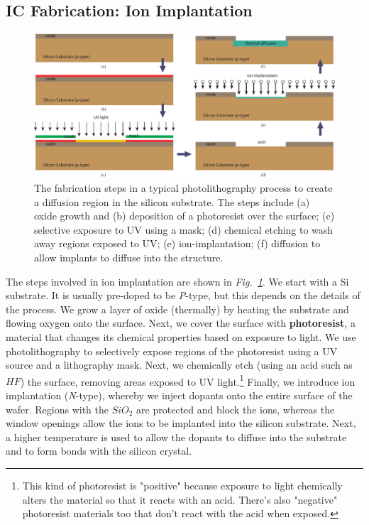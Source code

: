 \subsection{IC Fabrication: Ion Implantation}
\begin{figure}[tb]
\centering
\includegraphics[width=\columnwidth]{process_steps}
\caption{The fabrication steps in a typical photolithography process to create a diffusion region in the silicon substrate.  The steps include (a) oxide growth and (b) deposition of a photoresist over the surface; (c) selective exposure to UV using a mask; (d) chemical etching to wash away regions exposed to UV; (e) ion-implantation; (f) diffusion to allow implants to diffuse into the structure.} \label{fig:mod2-2_ICtech_sld_4}
\end{figure}
The steps involved in ion implantation are shown in \emph{Fig.~\ref{fig:mod2-2_ICtech_sld_4}}.  We start with a Si substrate.  It is usually pre-doped to be \emph{P}-type, but this depends on the details of the process.  We grow a layer of oxide (thermally) by heating the substrate and flowing oxygen onto the surface.  Next, we cover the surface with \textbf{photoresist}, a material that changes its chemical properties based on exposure to light.  We use photolithography to selectively expose regions of the photoresist using a UV source and a lithography mask.  Next, we chemically etch (using an acid such as $HF$)  the surface, removing areas exposed to UV light.\footnote{This kind of photoresist is "positive" because exposure to light chemically alters the material so that it reacts with an acid. There's also  "negative" photoresist materials too that don't react with the acid when exposed.}  Finally, we introduce ion implantation (\emph{N}-type), whereby we inject dopants onto the entire surface of the wafer.  Regions with the $SiO_2$ are protected and block the ions, whereas the window openings allow the ions to be implanted into the silicon substrate.  Next, a higher temperature is used to allow the dopants to diffuse into the substrate and to form bonds with the silicon crystal.
\newpage
